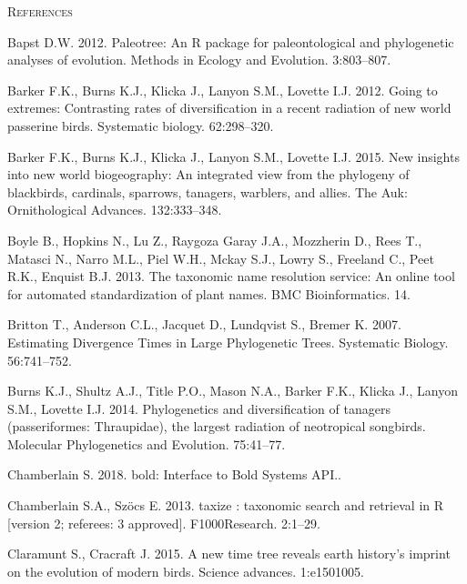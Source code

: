 \documentclass[]{article}
\begin{document}
\newpage

\begin{center}
\textsc{References}
\end{center}

\hypertarget{refs}{}
\leavevmode\hypertarget{ref-Bapst2012a}{}%
Bapst D.W. 2012. Paleotree: An R package for paleontological and phylogenetic analyses of evolution. Methods in Ecology and Evolution. 3:803--807.

\leavevmode\hypertarget{ref-barker2012going}{}%
Barker F.K., Burns K.J., Klicka J., Lanyon S.M., Lovette I.J. 2012. Going to extremes: Contrasting rates of diversification in a recent radiation of new world passerine birds. Systematic biology. 62:298--320.

\leavevmode\hypertarget{ref-barker2015new}{}%
Barker F.K., Burns K.J., Klicka J., Lanyon S.M., Lovette I.J. 2015. New insights into new world biogeography: An integrated view from the phylogeny of blackbirds, cardinals, sparrows, tanagers, warblers, and allies. The Auk: Ornithological Advances. 132:333--348.

\leavevmode\hypertarget{ref-Boyle2013}{}%
Boyle B., Hopkins N., Lu Z., Raygoza Garay J.A., Mozzherin D., Rees T., Matasci N., Narro M.L., Piel W.H., Mckay S.J., Lowry S., Freeland C., Peet R.K., Enquist B.J. 2013. The taxonomic name resolution service: An online tool for automated standardization of plant names. BMC Bioinformatics. 14.

\leavevmode\hypertarget{ref-Britton2007}{}%
Britton T., Anderson C.L., Jacquet D., Lundqvist S., Bremer K. 2007. Estimating Divergence Times in Large Phylogenetic Trees. Systematic Biology. 56:741--752.

\leavevmode\hypertarget{ref-burns2014phylogenetics}{}%
Burns K.J., Shultz A.J., Title P.O., Mason N.A., Barker F.K., Klicka J., Lanyon S.M., Lovette I.J. 2014. Phylogenetics and diversification of tanagers (passeriformes: Thraupidae), the largest radiation of neotropical songbirds. Molecular Phylogenetics and Evolution. 75:41--77.

\leavevmode\hypertarget{ref-Chamberlain2018}{}%
Chamberlain S. 2018. bold: Interface to Bold Systems API..

\leavevmode\hypertarget{ref-Chamberlain2013}{}%
Chamberlain S.A., Szöcs E. 2013. taxize : taxonomic search and retrieval in R {[}version 2; referees: 3 approved{]}. F1000Research. 2:1--29.

\leavevmode\hypertarget{ref-claramunt2015new}{}%
Claramunt S., Cracraft J. 2015. A new time tree reveals earth history's imprint on the evolution of modern birds. Science advances. 1:e1501005.
\end{document}
